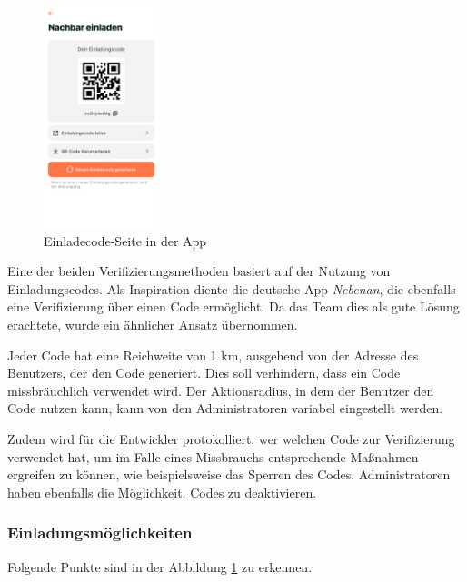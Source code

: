 \begin{figure}[H]
  \centering
  \includegraphics[width=0.3\textwidth]{pics/einladecode-page.png}
  \caption{Einladecode-Seite in der App}
  \label{fig:einladecode}
\end{figure}
Eine der beiden Verifizierungsmethoden basiert auf der Nutzung von Einladungscodes. Als Inspiration diente die deutsche App \textit{Nebenan}, die ebenfalls eine Verifizierung über einen Code ermöglicht. Da das Team dies als gute Lösung erachtete, wurde ein ähnlicher Ansatz übernommen.

Jeder Code hat eine Reichweite von 1 km, ausgehend von der Adresse des Benutzers, der den Code generiert. Dies soll verhindern, dass ein Code missbräuchlich verwendet wird. Der Aktionsradius, in dem der Benutzer den Code nutzen kann, kann von den Administratoren variabel eingestellt werden.

Zudem wird für die Entwickler protokolliert, wer welchen
Code zur Verifizierung verwendet hat, um im Falle eines
Missbrauchs entsprechende Maßnahmen ergreifen zu können, wie
beispielsweise das Sperren des Codes. Administratoren haben
ebenfalls die Möglichkeit, Codes zu deaktivieren.


\subsubsection{Einladungsmöglichkeiten}


Folgende Punkte sind in der Abbildung
\ref{fig:einladecode} zu erkennen.


